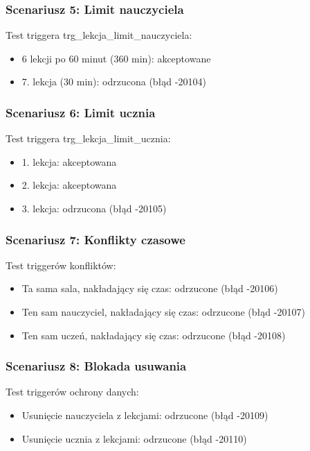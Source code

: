 \documentclass[12pt,a4paper]{article}
\begin{document}
\subsubsection{Scenariusz 5: Limit nauczyciela}
Test triggera trg\_lekcja\_limit\_nauczyciela:
\begin{itemize}[nosep]
    \item 6 lekcji po 60 minut (360 min): akceptowane
    \item 7. lekcja (30 min): odrzucona (błąd -20104)
\end{itemize}

\subsubsection{Scenariusz 6: Limit ucznia}
Test triggera trg\_lekcja\_limit\_ucznia:
\begin{itemize}[nosep]
    \item 1. lekcja: akceptowana
    \item 2. lekcja: akceptowana
    \item 3. lekcja: odrzucona (błąd -20105)
\end{itemize}

\subsubsection{Scenariusz 7: Konflikty czasowe}
Test triggerów konfliktów:
\begin{itemize}[nosep]
    \item Ta sama sala, nakładający się czas: odrzucone (błąd -20106)
    \item Ten sam nauczyciel, nakładający się czas: odrzucone (błąd -20107)
    \item Ten sam uczeń, nakładający się czas: odrzucone (błąd -20108)
\end{itemize}

\subsubsection{Scenariusz 8: Blokada usuwania}
Test triggerów ochrony danych:
\begin{itemize}[nosep]
    \item Usunięcie nauczyciela z lekcjami: odrzucone (błąd -20109)
    \item Usunięcie ucznia z lekcjami: odrzucone (błąd -20110)
\end{itemize}
\end{document}
